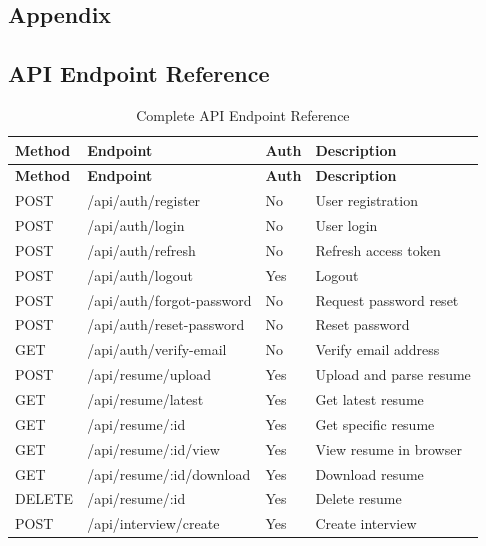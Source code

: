 \begin{appendices}

\chapter{Appendix}

\section{API Endpoint Reference}

\begin{longtable}{|L{1.5cm}|L{5.5cm}|L{1.8cm}|p{5.8cm}|}
\caption{Complete API Endpoint Reference} \label{tab:fullapi} \\
\hline
\textbf{Method} & \textbf{Endpoint} & \textbf{Auth} & \textbf{Description} \\
\hline
\endfirsthead
\hline
\textbf{Method} & \textbf{Endpoint} & \textbf{Auth} & \textbf{Description} \\
\hline
\endhead
POST & /api/auth/register & No & User registration \\
\hline
POST & /api/auth/login & No & User login \\
\hline
POST & /api/auth/refresh & No & Refresh access token \\
\hline
POST & /api/auth/logout & Yes & Logout \\
\hline
POST & /api/auth/forgot-password & No & Request password reset \\
\hline
POST & /api/auth/reset-password & No & Reset password \\
\hline
GET & /api/auth/verify-email & No & Verify email address \\
\hline
POST & /api/resume/upload & Yes & Upload and parse resume \\
\hline
GET & /api/resume/latest & Yes & Get latest resume \\
\hline
GET & /api/resume/:id & Yes & Get specific resume \\
\hline
GET & /api/resume/:id/view & Yes & View resume in browser \\
\hline
GET & /api/resume/:id/download & Yes & Download resume \\
\hline
DELETE & /api/resume/:id & Yes & Delete resume \\
\hline
POST & /api/interview/create & Yes & Create interview \\

\end{longtable}
\end{appendices}
